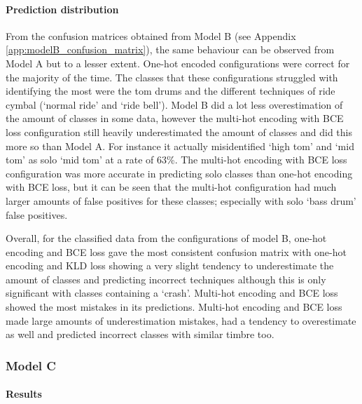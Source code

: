 \documentclass[12pt]{article}
\begin{document}
	\paragraph*{Prediction distribution}
	
	From the confusion matrices obtained from Model B (see Appendix \ref{app:modelB_confusion_matrix}), the same behaviour can be observed from Model A but to a lesser extent. One-hot encoded configurations were correct for the majority of the time. The classes that these configurations struggled with identifying the most were the tom drums and the different techniques of ride cymbal (`normal ride' and `ride bell'). Model B did a lot less overestimation of the amount of classes in some data, however the multi-hot encoding with BCE loss configuration still heavily underestimated the amount of classes and did this more so than Model A. For instance it actually misidentified `high tom' and `mid tom' as solo `mid tom' at a rate of 63\%. The multi-hot encoding with BCE loss configuration was more accurate in predicting solo classes than one-hot encoding with BCE loss, but it can be seen that the multi-hot configuration had much larger amounts of false positives for these classes; especially with solo `bass drum' false positives.\medskip
	
	Overall, for the classified data from the configurations of model B, one-hot encoding and BCE loss gave the most consistent confusion matrix with one-hot encoding and KLD loss showing a very slight tendency to underestimate the amount of classes and predicting incorrect techniques although this is only significant with classes containing a `crash'. Multi-hot encoding and BCE loss showed the most mistakes in its predictions. Multi-hot encoding and BCE loss made large amounts of underestimation mistakes, had a tendency to overestimate as well and predicted incorrect classes with similar timbre too.
	
	\subsubsection{Model C}
	\label{sec:evaluation_analysis_modelC}
	
	\paragraph*{Results}
	
\end{document}
